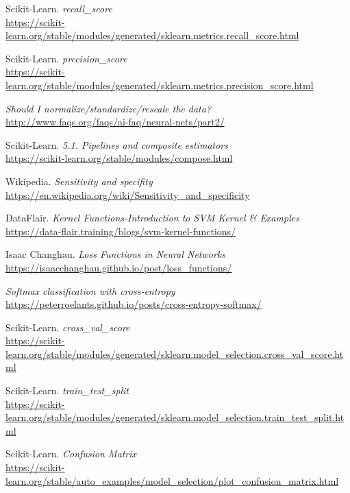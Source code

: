 \documentclass[11pt,a4paper]{article}
\begin{document}
\begin{thebibliography}{25}
Scikit-Learn. \textit{recall\_score}
\\\url{https://scikit-learn.org/stable/modules/generated/sklearn.metrics.recall_score.html}

Scikit-Learn. \textit{precision\_score}
\\\url{https://scikit-learn.org/stable/modules/generated/sklearn.metrics.precision_score.html}

\textit{Should I normalize/standardize/rescale the data?}
\\\url{http://www.faqs.org/faqs/ai-faq/neural-nets/part2/}

Scikit-Learn. \textit{5.1. Pipelines and composite estimators}
\\\url{https://scikit-learn.org/stable/modules/compose.html}

Wikipedia. \textit{Sensitivity and specifity}
\\\url{https://en.wikipedia.org/wiki/Sensitivity_and_specificity}

DataFlair. \textit{Kernel Functions-Introduction to SVM Kernel \& Examples}
\\\url{https://data-flair.training/blogs/svm-kernel-functions/}

Isaac Changhau. \textit{Loss Functions in Neural Networks}
\\\url{https://isaacchanghau.github.io/post/loss_functions/}

\textit{Softmax classification with cross-entropy}
\\\url{https://peterroelants.github.io/posts/cross-entropy-softmax/}

Scikit-Learn. \textit{cross\_val\_score}
\\\url{https://scikit-learn.org/stable/modules/generated/sklearn.model_selection.cross_val_score.html}

Scikit-Learn. \textit{train\_test\_split}
\\\url{https://scikit-learn.org/stable/modules/generated/sklearn.model_selection.train_test_split.html}

Scikit-Learn. \textit{Confusion Matrix}
\\\url{https://scikit-learn.org/stable/auto_examples/model_selection/plot_confusion_matrix.html}

\end{thebibliography}
\end{document}
